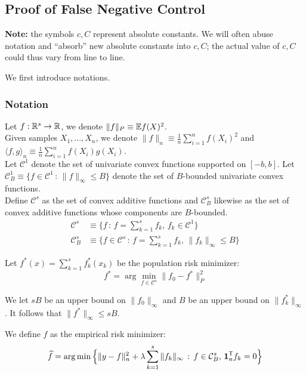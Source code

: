 
 
 
 \subsection{Proof of False Negative Control}
 \label{sec:false_negative_proof}
 
\textbf{Note:} the symbols $c,C$ represent absolute constants. We will often abuse notation and ``absorb'' new absolute constants into $c, C$; the actual value of $c, C$ could thus vary from line to line.

 We first introduce notations.
 \subsubsection{Notation} 
\label{sec:false_negative_proof_notations}

Let $f : \mathbb{R}^s \rightarrow {\mathbb R}$, we denote $\| f \|_P \equiv {\mathbb E} f(X)^2$. \\
Given samples $X_1,...,X_n$, we denote $\| f \|_n \equiv \frac{1}{n} \sum_{i=1}^n f(X_i)^2$ and $\langle f, g \rangle_n \equiv \frac{1}{n} \sum_{i=1}^n f(X_i) g(X_i)$. \\

Let $\mathcal{C}^1$ denote the set of univariate convex functions supported on $[-b,b]$. Let $\mathcal{C}^1_B \equiv \{ f \in \mathcal{C}^1 \,:\, \| f \|_\infty \leq B \}$ denote the set of $B$-bounded univariate convex functions. \\

Define $\mathcal{C}^s$ as the set of convex additive functions and $\mathcal{C}^s_B$ likewise as the set of convex additive functions whose components are $B$-bounded.
\begin{align*}
\mathcal{C}^s &\equiv \{ f \,:\, f = \sum_{k=1}^s f_k, \,
   f_k \in \mathcal{C}^1 \} \\
\mathcal{C}^s_B &\equiv \{ f \in \mathcal{C}^s \,:\, 
f = \sum_{k=1}^s f_k, \, \| f_k \|_\infty \leq B \}
\end{align*}

Let $f^*(x) = \sum_{k=1}^s f^*_k(x_k)$ be the population risk minimizer:
\[
f^* = \arg\min_{f \in \mathcal{C}^s} \| f_0 - f^* \|_P^2
\]

We let $sB$ be an upper bound on $\| f_0 \|_\infty$ and $B$ be an upper bound on $\| f^*_k \|_\infty$. It follows that $\|f^* \|_\infty \leq s B$.

We define $\hat{f}$ as the empirical risk minimizer:
\[
\widehat{f} = \arg\min \Big \{ \| y - f \|_n^2 + \lambda \sum_{k=1}^s \| f_k \|_\infty 
    \,:\, f \in \mathcal{C}^s_B,\, \mbox{\boldmath $1$}_n^{\mathsf{T}} f_k = 0 \Big \}
\]


